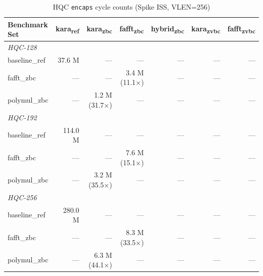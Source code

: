 \begin{table}[h]
  \centering
  \caption{HQC \texttt{encaps} cycle counts (Spike ISS, VLEN=256)}
  \label{tab:encaps_counts}
  \begin{tabular}{lrrrrrr}
    \toprule
    Benchmark Set & kara\textsubscript{ref} & kara\textsubscript{zbc} & fafft\textsubscript{zbc} & hybrid\textsubscript{zbc} & kara\textsubscript{zvbc} & fafft\textsubscript{zvbc} \\
    \midrule
    \multicolumn{7}{l}{\textit{HQC-128}} \\
    baseline_ref & 37.6 M & — & — & — & — & — \\
    fafft_zbc & — & — & 3.4 M (11.1×) & — & — & — \\
    polymul_zbc & — & 1.2 M (31.7×) & — & — & — & — \\
    \multicolumn{7}{l}{\textit{HQC-192}} \\
    baseline_ref & 114.0 M & — & — & — & — & — \\
    fafft_zbc & — & — & 7.6 M (15.1×) & — & — & — \\
    polymul_zbc & — & 3.2 M (35.5×) & — & — & — & — \\
    \multicolumn{7}{l}{\textit{HQC-256}} \\
    baseline_ref & 280.0 M & — & — & — & — & — \\
    fafft_zbc & — & — & 8.3 M (33.5×) & — & — & — \\
    polymul_zbc & — & 6.3 M (44.1×) & — & — & — & — \\
    \bottomrule
  \end{tabular}
\end{table}

